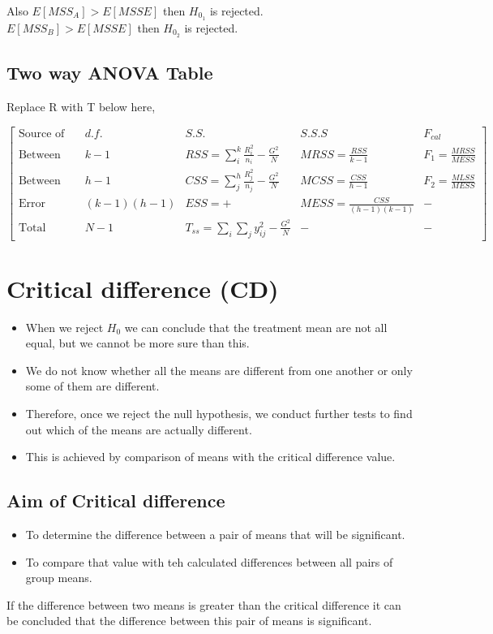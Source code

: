 \documentclass[oneside,11pt,pdftex]{book}%
\numberwithin{equation}{section}
\numberwithin{section}{chapter}
\numberwithin{equation}{chapter}
\begin{document}
Also $ E[MSS_A]>E[MSSE] $ then $ H_{0_1} $ is rejected.\\
$ E[MSS_B]>E[MSSE] $ then $ H_{0_2} $ is rejected.

\subsection{Two way ANOVA Table}
Replace R with T below here,

\[ \begin{bmatrix}
	\text{Source of variance} & d.f. & S.S. & S.S.S & F_{cal}\\
	\text{Between factor A} & k-1 & RSS=\sum_i^k \frac{R_i^2}{n_i}-\frac{G^2}{N} & MRSS=\frac{RSS}{k-1} & F_1=\frac{MRSS}{MESS}\\
	\text{Between factor B} & h-1 & CSS=\sum_j^h \frac{R_j^2}{n_j}-\frac{G^2}{N} & MCSS=\frac{CSS}{h-1} & F_2=\frac{MLSS}{MESS}\\
	\text{Error} & (k-1)(h-1) & ESS=+ & MESS=\frac{CSS}{(h-1)(k-1)} & -\\
	\text{Total} & N-1 & T_{ss}=\sum_i \sum_j y_{ij}^2-\frac{G^2}{N} & - & -
\end{bmatrix} \]

\section{Critical difference (CD)}
\begin{itemize}
	\item When we reject $ H_0 $ we can conclude that the treatment mean are not all equal, but we cannot be more sure than this.
	\item We do not know whether all the means are different from one another or only some of them are different.
	\item Therefore, once we reject the null hypothesis, we conduct further tests to find out which of the means are actually different.
	\item This is achieved by comparison of means with the critical difference value.
\end{itemize}

\subsection{Aim of Critical difference}
\begin{itemize}
	\item To determine the difference between a pair of means that will be significant.
	\item To compare that value with teh calculated differences between all pairs of group means.
\end{itemize}
If the difference between two means is greater than the critical difference it can be concluded that the difference between this pair of means is significant.
\end{document}
